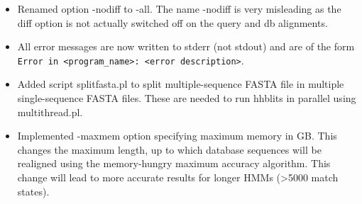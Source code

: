 \documentclass[11pt,a4paper]{article}
\begin{document}
\begin{itemize}
\item Renamed option -nodiff to -all. The name -nodiff is very misleading as
      the diff option is not actually switched off on the query and db alignments.

\item All error messages are now written to stderr (not stdout) and are of the form
  \verb`Error in <program_name>: <error description>`.

\item Added script splitfasta.pl to split multiple-sequence FASTA file in multiple
  single-sequence FASTA files. These are needed to run hhblits in parallel
  using multithread.pl.

\item Implemented -maxmem option specifying maximum memory in GB. This changes the 
  maximum length, up to which database sequences will be realigned using the
  memory-hungry maximum accuracy algorithm. This change will lead to more accurate
  results for longer HMMs (>5000 match states).
\end{itemize}
\end{document}
